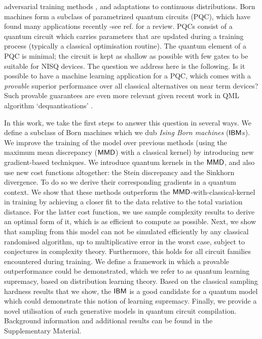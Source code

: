 adversarial training methods \cite{zeng_learning_2018}, and adaptations to continuous distributions\cite{romero_variational_2019}. Born machines form a subclass of parametrized  
quantum circuits (PQC), which have found many applications recently -see ref. \cite{benedetti_parameterized_2019} for a review. PQCs consist of a quantum circuit which carries parameters that are updated during a training process (typically a classical optimisation routine). The quantum element of a PQC is minimal; the circuit is kept as shallow as possible with few gates to be suitable for NISQ devices. The question we address here is the following. Is it possible to have a machine learning application for a PQC, which comes with a \textit{provable} superior performance over all classical alternatives on near term devices? Such provable guarantees are even more relevant given recent work in QML algorithm `dequantisations' \cite{tang_quantum-inspired_2018, tang_quantum-inspired_2018-1, andoni_solving_2018, chia_quantum-inspired_2018, gilyen_quantum-inspired_2018}. 

In this work, we take the first steps to answer this question in several ways. We define a subclass of Born machines which we dub \emph{Ising Born machines} ($\textsf{IBM}$s). We improve the training of the model over previous methods (using the maximum mean discrepancy\cite{liu_differentiable_2018} ($\operatorname{\textsf{MMD}}$) with a classical kernel) by introducing new gradient-based techniques. We introduce quantum kernels in the $\operatorname{\textsf{MMD}}$, and also use new cost functions altogether: the Stein discrepancy and the Sinkhorn divergence. To do so we derive their corresponding gradients in a quantum context. We show that these methods outperform the 
$\operatorname{\textsf{MMD}}$-with-classical-kernel in training by achieving a closer fit to the data relative to the total variation distance. For the latter cost function, we use sample complexity results to derive an optimal form of it, which is as efficient to compute as possible. Next, we show that sampling from this model can not be simulated efficiently by any classical randomised algorithm, up to multiplicative error in the worst case, subject to conjectures in complexity theory. Furthermore, this holds for all circuit families encountered during training. We define a framework in which a provable outperformance could be demonstrated, which we refer to as quantum learning supremacy, based on distribution learning theory\cite{kearns_learnability_1994}. Based on the classical sampling hardness results that we show, the $\textsf{IBM}$ is a good candidate for a quantum model which could demonstrate this notion of learning supremacy. Finally, we provide a novel utilisation of such generative models in quantum circuit compilation. Background information and additional results can be found in the Supplementary Material.



